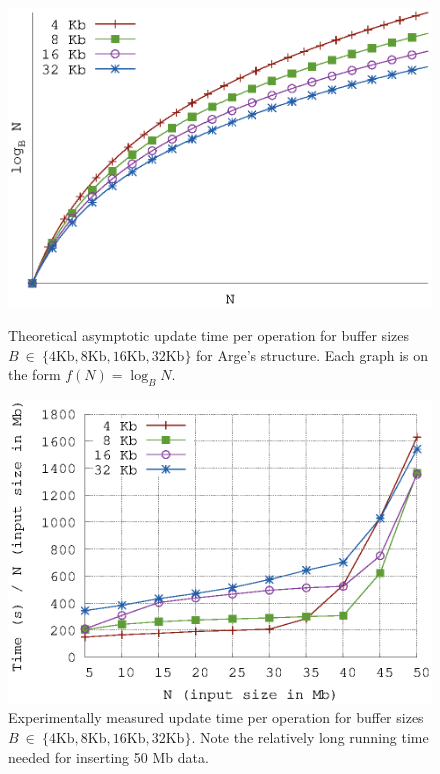 \documentclass[twoside,11pt,openright]{report}
\begin{document}
\begin{figure}[h]
\centering
\begin{minipage}[t]{0.48\columnwidth}
  \centering
  \includegraphics[width=\linewidth]{../plots/arge_complexities/arge_complexity}
  \caption{Theoretical asymptotic update time per operation for buffer sizes $B~\in~\{4\text{Kb},8\text{Kb},16\text{Kb},32\text{Kb}\}$ for Arge's structure. Each graph is on the form $f(N) = \log_B N$.}
  \label{fig:arge_buffer_size_theory}
\end{minipage}
\hfill
\begin{minipage}[t]{0.48\columnwidth}
  \centering
  \includegraphics[width=\linewidth]{../src/experiments/arge_buffer_size_experiment_results/2016-04-28.10_03_24/time}
  \caption{Experimentally measured update time per operation for buffer sizes $B~\in~\{4\text{Kb},8\text{Kb},16\text{Kb},32\text{Kb}\}$. Note the relatively long running time needed for inserting 50 Mb data.}
  \label{fig:arge_buffer_size_experiment}
\end{minipage}
\end{figure}
\end{document}
